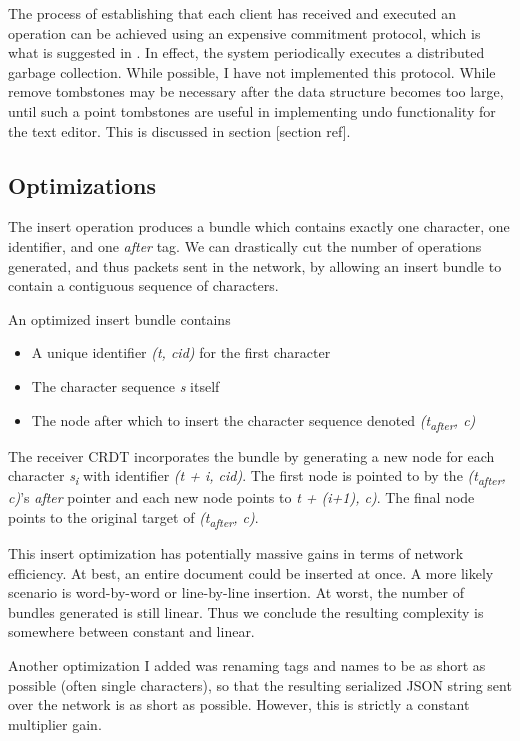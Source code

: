 \documentclass[12pt,a4paper,twoside,openright]{report}
\begin{document}
			The process of establishing that each client has received and executed an operation can be achieved using an expensive commitment protocol, which is what is suggested in \cite{preguica2009}. In effect, the system periodically executes a distributed garbage collection. While possible, I have not implemented this protocol. While remove tombstones may be necessary after the data structure becomes too large, until such a point tombstones are useful in implementing undo functionality for the text editor. This is discussed in section [section ref].
		
		\subsection{Optimizations}
			The insert operation produces a bundle which contains exactly one character, one identifier, and one \textit{after} tag. We can drastically cut the number of operations generated, and thus packets sent in the network, by allowing an insert bundle to contain a contiguous sequence of characters. 
			
			An optimized insert bundle contains
			\begin{itemize}
				\item A unique identifier  \textit{(t, cid)} for the first character
				\item The character sequence \textit{s} itself
				\item The node after which to insert the character sequence denoted \textit{(t\textsubscript{after}, c)}
			\end{itemize}
			The receiver CRDT incorporates the bundle by generating a new node for each character \textit{s\textsubscript{i}} with identifier \textit{(t + i, cid)}. The first node is pointed to by the \textit{(t\textsubscript{after}, c)}'s \textit{after} pointer and each new node points to \textit{t + (i+1), c)}. The final node points to the original target of \textit{(t\textsubscript{after}, c)}.
			
			This insert optimization has potentially massive gains in terms of network efficiency. At best, an entire document could be inserted at once. A more likely scenario is word-by-word or line-by-line insertion. At worst, the number of bundles generated is still linear. Thus we conclude the resulting complexity is somewhere between constant and linear.
			
			Another optimization I added was renaming tags and names to be as short as possible (often single characters), so that the resulting serialized JSON string sent over the network is as short as possible. However, this is strictly a constant multiplier gain.
	
\end{document}
